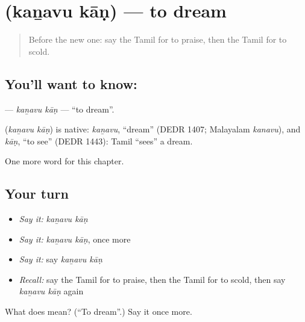\section[\texorpdfstring{\ta{கனவு} \ta{காண்} (kaṉavu kāṇ)}{கனவு காண் (kaṉavu kāṇ)}]{  (kaṉavu kāṇ) — to dream}

\label{lesson:TA-C229-kanavu-kan}



\begin{quote}
Before the new one: say the Tamil for to praise, then the Tamil for to scold.
\end{quote}

\subsection*{You'll want to know:  }
\textbf{ } — \emph{kaṉavu kāṇ} — \textquotedblleft{}to dream\textquotedblright{}.

\begin{cousinweb}
\textbf{ } (\emph{kaṉavu kāṇ}) is native: \emph{kaṉavu}, \textquotedblleft{}dream\textquotedblright{} (DEDR 1407; Malayalam \emph{kanavu}), and \emph{kāṇ}, \textquotedblleft{}to see\textquotedblright{} (DEDR 1443): Tamil \textquotedblleft{}sees\textquotedblright{} a dream.
\end{cousinweb}

\begin{grammarlens}[title={What you've built}]
One more word for this chapter.
\end{grammarlens}

\subsection*{Your turn}
\begin{itemize}
\raggedright
  \item \emph{Say it:} \emph{kaṉavu kāṇ}
  \item \emph{Say it:} \emph{kaṉavu kāṇ}, once more
  \item \emph{Say it:} say \emph{kaṉavu kāṇ}
  \item \emph{Recall:} say the Tamil for to praise, then the Tamil for to scold, then say \emph{kaṉavu kāṇ} again
\end{itemize}

\begin{tcolorbox}[breakable,colback=teal!4,colframe=teal!35!black,title={Before you move on}]
What does   mean? (\textquotedblleft{}To dream\textquotedblright{}.) Say it once more.
\end{tcolorbox}
